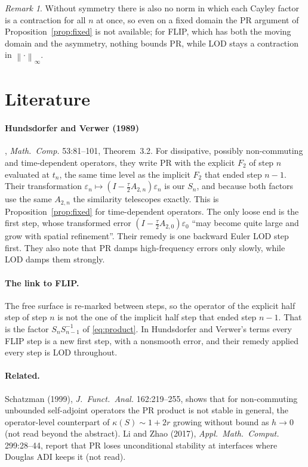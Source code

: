 \documentclass[11pt]{article}
\theoremstyle{remark}
\newtheorem*{remark}{Remark}
\newcommand{\norm}[1]{\left\lVert #1 \right\rVert}
\newcommand{\Id}{I}
\begin{document}
\begin{remark}
Without symmetry there is also no norm in which each Cayley factor is a contraction for all $n$ at once, so even on a fixed domain the PR argument of Proposition~\ref{prop:fixed} is not available; for FLIP, which has both the moving domain and the asymmetry, nothing bounds PR, while LOD stays a contraction in $\norm{\cdot}_\infty$.
\end{remark}

\section{Literature}

\paragraph{Hundsdorfer and Verwer (1989)}, \emph{Math.\ Comp.} 53:81--101, Theorem~3.2. For dissipative, possibly non-commuting and time-dependent operators, they write PR with the explicit $F_2$ of step $n$ evaluated at $t_n$, the same time level as the implicit $F_2$ that ended step $n-1$. Their transformation $\varepsilon_n \mapsto (\Id - \tfrac{\tau}{2}A_{2,n})\varepsilon_n$ is our $S_n$, and because both factors use the same $A_{2,n}$ the similarity telescopes exactly. This is Proposition~\ref{prop:fixed} for time-dependent operators. The only loose end is the first step, whose transformed error $(\Id - \tfrac{\tau}{2}A_{2,0})\varepsilon_0$ ``may become quite large and grow with spatial refinement''. Their remedy is one backward Euler LOD step first. They also note that PR damps high-frequency errors only slowly, while LOD damps them strongly.

\paragraph{The link to FLIP.} The free surface is re-marked between steps, so the operator of the explicit half step of step $n$ is not the one of the implicit half step that ended step $n-1$. That is the factor $S_n S_{n-1}^{-1}$ of \eqref{eq:product}. In Hundsdorfer and Verwer's terms every FLIP step is a new first step, with a nonsmooth error, and their remedy applied every step is LOD throughout.

\paragraph{Related.} Schatzman (1999), \emph{J.\ Funct.\ Anal.} 162:219--255, shows that for non-commuting unbounded self-adjoint operators the PR product is not stable in general, the operator-level counterpart of $\kappa(S) \sim 1 + 2r$ growing without bound as $h \to 0$ (not read beyond the abstract). Li and Zhao (2017), \emph{Appl.\ Math.\ Comput.} 299:28--44, report that PR loses unconditional stability at interfaces where Douglas ADI keeps it (not read).
\end{document}

